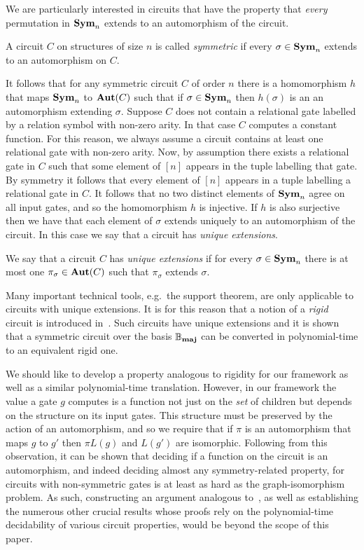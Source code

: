 \documentclass[a4paper,UKenglish]{lipics-v2018}
\begin{document}
We are particularly interested in circuits that have the property that
\emph{every} permutation in $\text{\textbf{Sym}}_n$ extends to an automorphism of the circuit.

\begin{definition}[Symmetry]
  A circuit $C$ on structures of size $n$ is called \emph{symmetric} if every
  $\sigma \in \text{\textbf{Sym}}_n$ extends to an automorphism on $C$.
\end{definition}

It follows that for any symmetric circuit $C$ of order $n$ there is a
homomorphism $h$ that maps $\text{\textbf{Sym}}_n$ to $\text{\textbf{Aut}}(C)$ such that if $\sigma \in
\text{\textbf{Sym}}_n$ then $h(\sigma)$ is an an automorphism extending $\sigma$. Suppose $C$
does not contain a relational gate labelled by a relation symbol with non-zero
arity. In that case $C$ computes a constant function. For this reason, we always
assume a circuit contains at least one relational gate with non-zero arity. Now,
by assumption there exists a relational gate in $C$ such that some element of
$[n]$ appears in the tuple labelling that gate. By symmetry it follows that
every element of $[n]$ appears in a tuple labelling a relational gate in $C$. It
follows that no two distinct elements of $\text{\textbf{Sym}}_n$ agree on all input gates, and
so the homomorphism $h$ is injective. If $h$ is also surjective then we have
that each element of $\sigma$ extends uniquely to an automorphism of the
circuit. In this case we say that a circuit has \emph{unique extensions}.

\begin{definition}
  We say that a circuit $C$ has \emph{unique extensions} if for every $\sigma
  \in \text{\textbf{Sym}}_n$ there is at most one $\pi_{\sigma} \in \text{\textbf{Aut}}(C)$ such that
  $\pi_{\sigma}$ extends $\sigma$.
\end{definition}

Many important technical tools, e.g.\ the support theorem, are only applicable
to circuits with unique extensions. It is for this reason that a notion of a
\emph{rigid} circuit is introduced in~\cite{AndersonD17}. Such circuits have
unique extensions and it is shown that a symmetric circuit over the basis $\mathbb{B}_{\text{\textbf{maj}}}$
can be converted in polynomial-time to an equivalent rigid one.

We should like to develop a property analogous to rigidity for our framework as
well as a similar polynomial-time translation. However, in our framework the
value a gate $g$ computes is a function not just on the \emph{set} of children
but depends on the structure on its input gates. This structure must be
preserved by the action of an automorphism, and so we require that if $\pi$ is
an automorphism that maps $g$ to $g'$ then $\pi L(g)$ and $L(g')$ are
isomorphic. Following from this observation, it can be shown that deciding if a
function on the circuit is an automorphism, and indeed deciding almost any
symmetry-related property, for circuits with non-symmetric gates is at least as
hard as the graph-isomorphism problem. As such, constructing an argument
analogous to~\cite{AndersonD17}, as well as establishing the numerous other
crucial results whose proofs rely on the polynomial-time decidability of various
circuit properties, would be beyond the scope of this paper.
\end{document}
